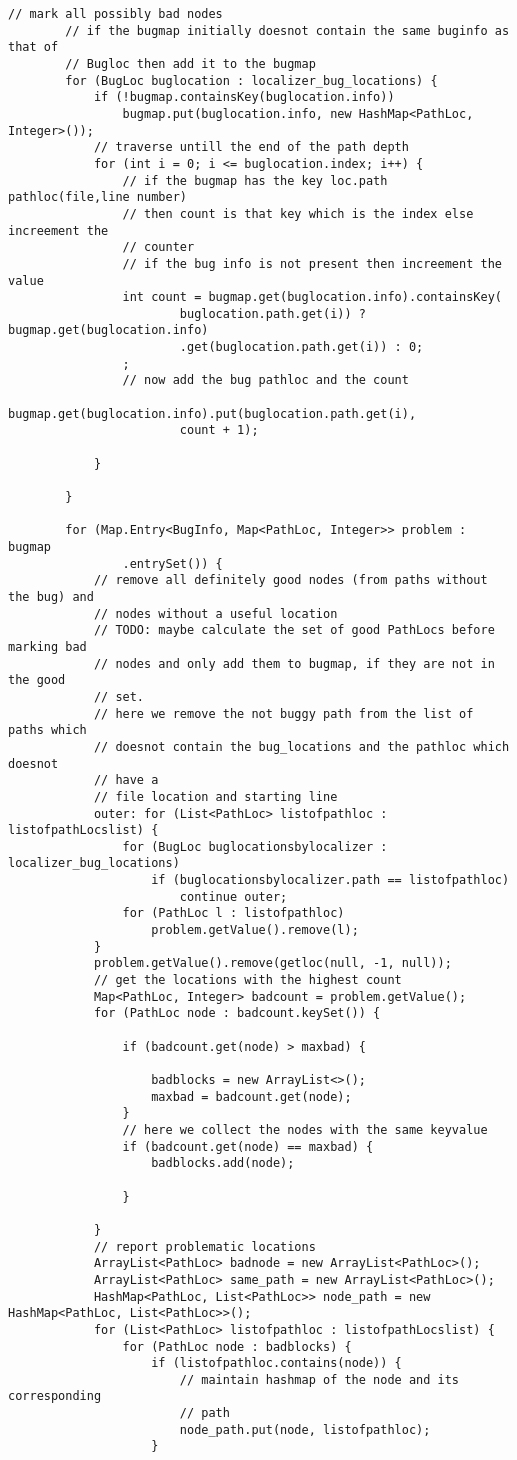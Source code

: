 \begin{lstlisting}[caption={Localizer},label={lst:Localizer}]
		// mark all possibly bad nodes
		// if the bugmap initially doesnot contain the same buginfo as that of
		// Bugloc then add it to the bugmap
		for (BugLoc buglocation : localizer_bug_locations) {
			if (!bugmap.containsKey(buglocation.info))
				bugmap.put(buglocation.info, new HashMap<PathLoc, Integer>());
			// traverse untill the end of the path depth
			for (int i = 0; i <= buglocation.index; i++) {
				// if the bugmap has the key loc.path pathloc(file,line number)
				// then count is that key which is the index else increement the
				// counter
				// if the bug info is not present then increement the value
				int count = bugmap.get(buglocation.info).containsKey(
						buglocation.path.get(i)) ? bugmap.get(buglocation.info)
						.get(buglocation.path.get(i)) : 0;
				;
				// now add the bug pathloc and the count
				bugmap.get(buglocation.info).put(buglocation.path.get(i),
						count + 1);

			}

		}

		for (Map.Entry<BugInfo, Map<PathLoc, Integer>> problem : bugmap
				.entrySet()) {
			// remove all definitely good nodes (from paths without the bug) and
			// nodes without a useful location
			// TODO: maybe calculate the set of good PathLocs before marking bad
			// nodes and only add them to bugmap, if they are not in the good
			// set.
			// here we remove the not buggy path from the list of paths which
			// doesnot contain the bug_locations and the pathloc which doesnot
			// have a
			// file location and starting line
			outer: for (List<PathLoc> listofpathloc : listofpathLocslist) {
				for (BugLoc buglocationsbylocalizer : localizer_bug_locations)
					if (buglocationsbylocalizer.path == listofpathloc)
						continue outer;
				for (PathLoc l : listofpathloc)
					problem.getValue().remove(l);
			}
			problem.getValue().remove(getloc(null, -1, null));
			// get the locations with the highest count
			Map<PathLoc, Integer> badcount = problem.getValue();
			for (PathLoc node : badcount.keySet()) {

				if (badcount.get(node) > maxbad) {

					badblocks = new ArrayList<>();
					maxbad = badcount.get(node);
				}
				// here we collect the nodes with the same keyvalue
				if (badcount.get(node) == maxbad) {
					badblocks.add(node);

				}

			}
			// report problematic locations
			ArrayList<PathLoc> badnode = new ArrayList<PathLoc>();
			ArrayList<PathLoc> same_path = new ArrayList<PathLoc>();
			HashMap<PathLoc, List<PathLoc>> node_path = new HashMap<PathLoc, List<PathLoc>>();
			for (List<PathLoc> listofpathloc : listofpathLocslist) {
				for (PathLoc node : badblocks) {
					if (listofpathloc.contains(node)) {
						// maintain hashmap of the node and its corresponding
						// path
						node_path.put(node, listofpathloc);
					}


\end{lstlisting}
